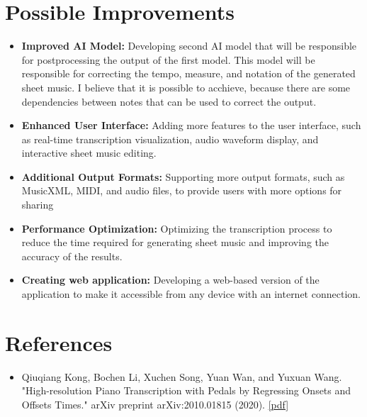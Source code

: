 \documentclass{article}
\begin{document}
\section{Possible Improvements}
\begin{itemize}
    \item \textbf{Improved AI Model:} Developing second AI model that will be responsible for postprocessing the output of the first model. This model will be responsible for correcting the tempo, measure, and notation of the generated sheet music. I believe that it is possible to acchieve, because there are some dependencies between notes that can be used to correct the output.
    \item \textbf{Enhanced User Interface:} Adding more features to the user interface, such as real-time transcription visualization, audio waveform display, and interactive sheet music editing.
    \item \textbf{Additional Output Formats:} Supporting more output formats, such as MusicXML, MIDI, and audio files, to provide users with more options for sharing
    \item \textbf{Performance Optimization:} Optimizing the transcription process to reduce the time required for generating sheet music and improving the accuracy of the results.
    \item \textbf{Creating web application:} Developing a web-based version of the application to make it accessible from any device with an internet connection.
\end{itemize}

\FloatBarrier
\section{References}
\begin{itemize}
    \item Qiuqiang Kong, Bochen Li, Xuchen Song, Yuan Wan, and Yuxuan Wang. "High-resolution Piano Transcription with Pedals by Regressing Onsets and Offsets Times." arXiv preprint arXiv:2010.01815 (2020). \href{https://arxiv.org/pdf/2010.01815.pdf}{[pdf]}
\end{itemize}
\end{document}
